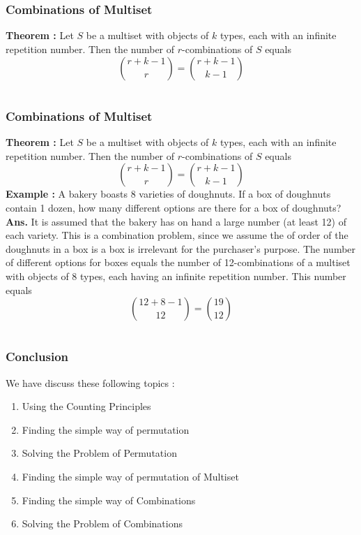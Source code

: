 \documentclass{beamer}
\begin{document}
\section{}
 \begin{frame}
\frametitle{Combinations of Multiset}
{\bf Theorem :} Let $S$ be a multiset with objects of $k$ types, each with an infinite repetition number. Then the number of $r$-combinations of $S$ equals
$$\binom{r+k-1}{r}=\binom{r+k-1}{k-1}$$
\end{frame}

\section{}
 \begin{frame}
\frametitle{Combinations of Multiset}
{\bf Theorem :} Let $S$ be a multiset with objects of $k$ types, each with an infinite repetition number. Then the number of $r$-combinations of $S$ equals
$$\binom{r+k-1}{r}=\binom{r+k-1}{k-1}$$
{\bf Example :} A bakery boasts 8 varieties of doughnuts. If a box of doughnuts contain 1 dozen, how many different options are there for a box of doughnuts? \\
{\bf Ans. } It is assumed that the bakery has on hand a large number (at least 12) of each variety. This is a combination problem, since we assume the of order of the doughnuts in a box is a box is irrelevant for the purchaser's purpose. The number of different options for boxes equals the number of 12-combinations of a multiset with objects of 8 types, each having an infinite repetition number. This number equals \\
     $$\binom{12+8-1}{12}=\binom{19}{12}$$
\end{frame}

\section{}
 \begin{frame}
\frametitle{Conclusion}
We have discuss these following topics :{\vspace{.2cm}}
\begin{enumerate}
  \item Using the Counting Principles{\vspace{.2cm}}
  \item Finding the simple way of permutation{\vspace{.2cm}}
  \item Solving the Problem of Permutation{\vspace{.2cm}}
  \item Finding the simple way of permutation of Multiset{\vspace{.2cm}}
  \item Finding the simple way of Combinations{\vspace{.2cm}}
  \item Solving the Problem of Combinations{\vspace{.2cm}}
\end{enumerate}
\end{frame}
\end{document}
